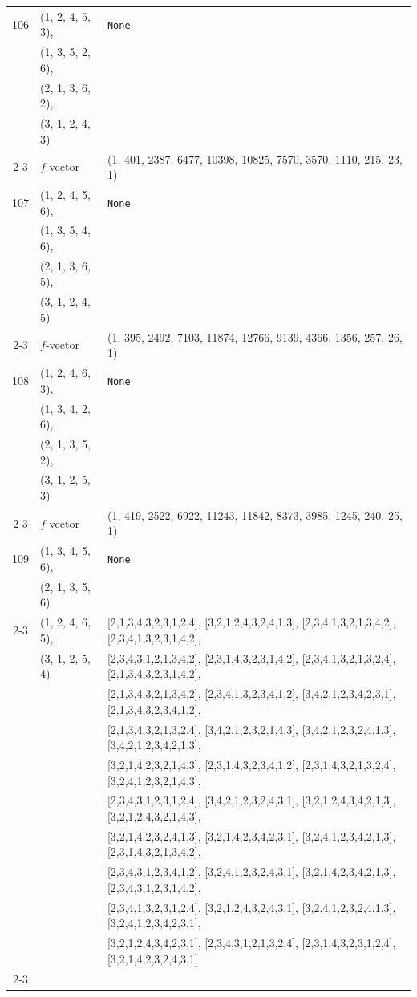 \documentclass[10pt]{amsart}
\numberwithin{equation}{section}
\theoremstyle{plain}
\theoremstyle{definition}
\theoremstyle{remark}
\begin{document}
{\begin{longtable}{c|l|l}
		106 & (1, 2, 4, 5, 3), & \texttt{None} \\
		& (1, 3, 5, 2, 6), &  \\
		& (2, 1, 3, 6, 2), &  \\
		& (3, 1, 2, 4, 3) &  \\ \cline{2-3}
		
		& $f$-vector & {(1, 401, 2387, 6477, 10398, 10825, 7570, 3570, 1110, 215, 23, 1)} \\
		\midrule
		
		107 & (1, 2, 4, 5, 6), & \texttt{None} \\
		& (1, 3, 5, 4, 6), &  \\
		& (2, 1, 3, 6, 5), &  \\
		& (3, 1, 2, 4, 5) &  \\ \cline{2-3}
		
		& $f$-vector & {(1, 395, 2492, 7103, 11874, 12766, 9139, 4366, 1356, 257, 26, 1)} \\
		\midrule
		
		108 & (1, 2, 4, 6, 3), & \texttt{None} \\
		& (1, 3, 4, 2, 6), &  \\
		& (2, 1, 3, 5, 2), &  \\
		& (3, 1, 2, 5, 3) &  \\ \cline{2-3}
		
		& $f$-vector & {(1, 419, 2522, 6922, 11243, 11842, 8373, 3985, 1245, 240, 25, 1)} \\
		\midrule
		
		109 & (1, 3, 4, 5, 6), & \texttt{None} \\
		& (2, 1, 3, 5, 6) &  \\ \cline{2-3}
		
		& (1, 2, 4, 6, 5), & [2,1,3,4,3,2,3,1,2,4], [3,2,1,2,4,3,2,4,1,3], [2,3,4,1,3,2,1,3,4,2], [2,3,4,1,3,2,3,1,4,2], \\
		& (3, 1, 2, 5, 4) & [2,3,4,3,1,2,1,3,4,2], [2,3,1,4,3,2,3,1,4,2], [2,3,4,1,3,2,1,3,2,4], [2,1,3,4,3,2,3,1,4,2], \\
		&  & [2,1,3,4,3,2,1,3,4,2], [2,3,4,1,3,2,3,4,1,2], [3,4,2,1,2,3,4,2,3,1], [2,1,3,4,3,2,3,4,1,2], \\
		&  & [2,1,3,4,3,2,1,3,2,4], [3,4,2,1,2,3,2,1,4,3], [3,4,2,1,2,3,2,4,1,3], [3,4,2,1,2,3,4,2,1,3], \\
		&  & [3,2,1,4,2,3,2,1,4,3], [2,3,1,4,3,2,3,4,1,2], [2,3,1,4,3,2,1,3,2,4], [3,2,4,1,2,3,2,1,4,3], \\
		&  & [2,3,4,3,1,2,3,1,2,4], [3,4,2,1,2,3,2,4,3,1], [3,2,1,2,4,3,4,2,1,3], [3,2,1,2,4,3,2,1,4,3], \\
		&  & [3,2,1,4,2,3,2,4,1,3], [3,2,1,4,2,3,4,2,3,1], [3,2,4,1,2,3,4,2,1,3], [2,3,1,4,3,2,1,3,4,2], \\
		&  & [2,3,4,3,1,2,3,4,1,2], [3,2,4,1,2,3,2,4,3,1], [3,2,1,4,2,3,4,2,1,3], [2,3,4,3,1,2,3,1,4,2], \\
		&  & [2,3,4,1,3,2,3,1,2,4], [3,2,1,2,4,3,2,4,3,1], [3,2,4,1,2,3,2,4,1,3], [3,2,4,1,2,3,4,2,3,1], \\
		&  & [3,2,1,2,4,3,4,2,3,1], [2,3,4,3,1,2,1,3,2,4], [2,3,1,4,3,2,3,1,2,4], [3,2,1,4,2,3,2,4,3,1] \\ \cline{2-3}
		

\end{longtable}}
\end{document}
